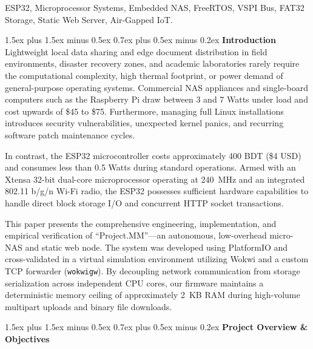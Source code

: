 ﻿\documentclass[conference]{IEEEtran}
\makeatletter
\renewcommand\section{\@startsection{section}{1}{\z@}%
  {1.5ex plus 1.5ex minus 0.5ex}%
  {0.7ex plus 0.5ex minus 0.2ex}%
  {\normalfont\normalsize\bfseries\centering}}
\makeatother
\begin{document}
\begin{IEEEkeywords}
ESP32, Microprocessor Systems, Embedded NAS, FreeRTOS, VSPI Bus, FAT32 Storage, Static Web Server, Air-Gapped IoT.
\end{IEEEkeywords}

\section{\textbf{Introduction}}
Lightweight local data sharing and edge document distribution in field environments, disaster recovery zones, and academic laboratories rarely require the computational complexity, high thermal footprint, or power demand of general-purpose operating systems. Commercial NAS appliances and single-board computers such as the Raspberry Pi draw between 3 and 7 Watts under load and cost upwards of \$45 to \$75. Furthermore, managing full Linux installations introduces security vulnerabilities, unexpected kernel panics, and recurring software patch maintenance cycles.

In contrast, the ESP32 microcontroller costs approximately 400 BDT (\$4 USD) and consumes less than 0.5 Watts during standard operations. Armed with an Xtensa 32-bit dual-core microprocessor operating at 240~MHz and an integrated 802.11 b/g/n Wi-Fi radio, the ESP32 possesses sufficient hardware capabilities to handle direct block storage I/O and concurrent HTTP socket transactions.

This paper presents the comprehensive engineering, implementation, and empirical verification of ``Project.MM''---an autonomous, low-overhead micro-NAS and static web node. The system was developed using PlatformIO and cross-validated in a virtual simulation environment utilizing Wokwi and a custom TCP forwarder (\texttt{wokwigw}). By decoupling network communication from storage serialization across independent CPU cores, our firmware maintains a deterministic memory ceiling of approximately 2~KB RAM during high-volume multipart uploads and binary file downloads.

\section{\textbf{Project Overview \& Objectives}}
\end{document}
